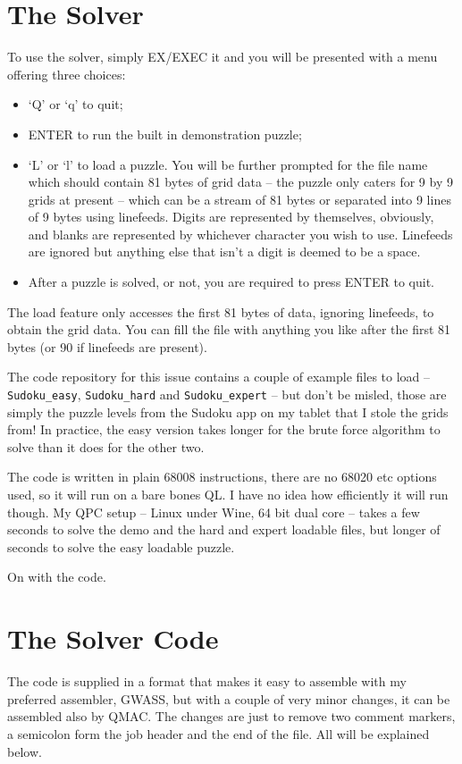 \section{The Solver}

To use the solver, simply EX/EXEC it and you will be presented with
a menu offering three choices:
\begin{itemize}
\item `Q' or `q' to quit;
\item ENTER to run the built in demonstration puzzle;
\item `L' or `l' to load a puzzle. You will be further prompted for
the file name which should contain 81 bytes of grid data -- the puzzle
only caters for 9 by 9 grids at present -- which can be a stream
of 81 bytes or separated into 9 lines of 9 bytes using linefeeds.
Digits are represented by themselves, obviously, and blanks are represented
by whichever character you wish to use. Linefeeds are ignored but
anything else that isn't a digit is deemed to be a space.
\item After a puzzle is solved, or not, you are required to press ENTER
to quit.
\end{itemize}
The load feature only accesses the first 81 bytes of data, ignoring
linefeeds, to obtain the grid data. You can fill the file with anything
you like after the first 81 bytes (or 90 if linefeeds are present).

The code repository for this issue contains a couple of example files
to load -- \texttt{Sudoku\_easy}, \texttt{Sudoku\_hard} and \texttt{Sudoku\_expert}
-- but don't be misled, those are simply the puzzle levels from the
Sudoku app on my tablet that I stole the grids from! In practice,
the easy version takes longer for the brute force algorithm to solve
than it does for the other two.

The code is written in plain 68008 instructions, there are no 68020
etc options used, so it will run on a bare bones QL. I have no idea
how efficiently it will run though. My QPC setup -- Linux under Wine,
64 bit dual core -- takes a few seconds to solve the demo and the
hard and expert loadable files, but longer of seconds to solve the
easy loadable puzzle. 

On with the code.

\section{The Solver Code}

The code is supplied in a format that makes it easy to assemble with
my preferred assembler, GWASS, but with a couple of very minor changes,
it can be assembled also by QMAC. The changes are just to remove two
comment markers, a semicolon form the job header and the end of the
file. All will be explained below.

